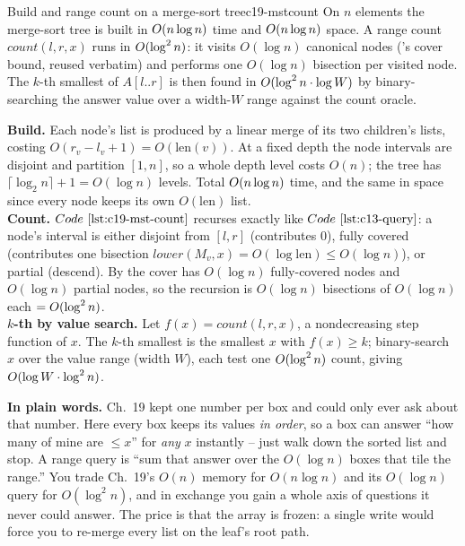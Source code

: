 \begin{theorem}{Build and range count on a merge-sort tree}{c19-mstcount}
On \(n\) elements the merge-sort tree is built in \(O(n\log n)\) time and \(O(n\log n)\) space.  A range count \(\mathit{count}(l,r,x)\) runs in \(O(\log^2 n)\): it visits \(O(\log n)\) canonical nodes ('s cover bound, reused verbatim) and performs one \(O(\log n)\) bisection per visited node.  The \(k\)-th smallest of \(A[l..r]\) is then found in \(O(\log^2 n\cdot\log W)\) by binary-searching the answer value over a width-\(W\) range against the count oracle.
\end{theorem}
\begin{proofbox}
\textbf{Build.} Each node's list is produced by a linear merge of its two children's lists, costing \(O(r_v-l_v+1)=O(\text{len}(v))\).  At a fixed depth the node intervals are disjoint and partition \([1,n]\), so a whole depth level costs \(O(n)\); the tree has \(\lceil\log_2 n\rceil+1=O(\log n)\) levels.  Total \(O(n\log n)\) time, and the same in space since every node keeps its own \(O(\text{len})\) list.\\
\textbf{Count.} \(\coderef{c19-mst-count}\) recurses exactly like \(\coderef{c13-query}\): a node's interval is either disjoint from \([l,r]\) (contributes \(0\)), fully covered (contributes one bisection \(\mathit{lower}(M_v,x)=O(\log\text{len})\le O(\log n)\)), or partial (descend).  By  the cover has \(O(\log n)\) fully-covered nodes and \(O(\log n)\) partial nodes, so the recursion is \(O(\log n)\) bisections of \(O(\log n)\) each \(=O(\log^2 n)\).\\
\textbf{\(k\)-th by value search.} Let \(f(x)=\mathit{count}(l,r,x)\), a nondecreasing step function of \(x\).  The \(k\)-th smallest is the smallest \(x\) with \(f(x)\ge k\); binary-search \(x\) over the value range (width \(W\)), each test one \(O(\log^2 n)\) count, giving \(O(\log W\cdot\log^2 n)\).
\end{proofbox}

\noindent\textbf{In plain words.}  Ch.~19 kept one number per box and could only ever ask about that number.  Here every box keeps its values \emph{in order}, so a box can answer ``how many of mine are \(\le x\)'' for \emph{any} \(x\) instantly -- just walk down the sorted list and stop.  A range query is ``sum that answer over the \(O(\log n)\) boxes that tile the range.''  You trade Ch.~19's \(O(n)\) memory for \(O(n\log n)\) and its \(O(\log n)\) query for \(O(\log^2 n)\), and in exchange you gain a whole axis of questions it never could answer.  The price is that the array is frozen: a single write would force you to re-merge every list on the leaf's root path.

